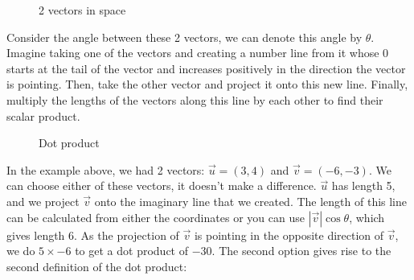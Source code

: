 \documentclass[a4paper,oneside]{report}
\begin{document}
\begin{figure}[h]
	\centering

	2 vectors in space
\end{figure}

Consider the angle between these 2 vectors, we can denote this angle by
\( \theta \). Imagine taking one of the vectors and creating a number line
from it whose 0 starts at the tail of the vector and increases positively
in the direction the vector is pointing. Then, take the other vector and
project it onto this new line. Finally, multiply the lengths of the vectors
along this line by each other to find their scalar product.

\begin{figure}[h]
	\centering

	Dot product
\end{figure}

In the example above, we had 2 vectors: \( \overrightarrow{u} = (3, 4) \) and
\( \overrightarrow{v} = (-6, -3) \). We can choose either of these vectors, it
doesn't make a difference. \( \overrightarrow{u} \) has length 5, and we
project \( \overrightarrow{v} \) onto the imaginary line that we created. The
length of this line can be calculated from either the coordinates or you can
use \( | \overrightarrow{v} | \cos{\theta} \), which gives length 6. As the
projection of \( \overrightarrow{v} \) is pointing in the opposite direction
of \( \overrightarrow{v} \), we do \( 5 \times -6 \) to get a dot product of
\( -30 \). The second option gives rise to the second definition of the dot
product:
\end{document}
